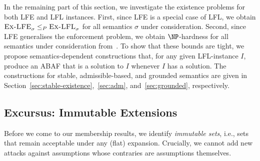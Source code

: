 \documentclass[letterpaper]{article} %
\newcommand{\ExLFE}[2]{\textsc{Ex-LFE}_{#1}^{#2}}
\newcommand{\ExLFL}[2]{\textsc{Ex-LFL}_{#1}^{#2}}
\begin{document}
\newcommand{\immut}[1]{\mathit{Imt}_{#1}}

In the remaining part of this section, we investigate the existence problems for both LFE and LFL instances. 
First, since LFE is a special case of LFL, we obtain $\ExLFE{\sigma}{}\leq_P\ExLFL{\sigma}{}$ for all semantics $\sigma$ under consideration.
Second, since LFE generalises the enforcement problem, 
we obtain $\NP$-hardness for all semantics under consideration from~\cite[Theorem 4.5]{RapbergerU23}.
To show that these bounds are tight, we propose semantics-dependent constructions that, for any given LFL-instance $I$, produce an ABAF that is a solution to $I$ whenever $I$ has a solution.
The constructions for stable, admissible-based, and grounded semantics are given in Section~\ref{sec:stable-existence},~\ref{sec:adm}, and~\ref{sec:grounded}, respectively. 





\subsection{Excursus: Immutable Extensions}\label{sec:immutable}
Before we come to our membership results, we identify \emph{immutable sets}, i.e., sets that remain acceptable under any (flat) expansion. Crucially, we cannot add new attacks against assumptions whose contraries are assumptions themselves.

\end{document}
